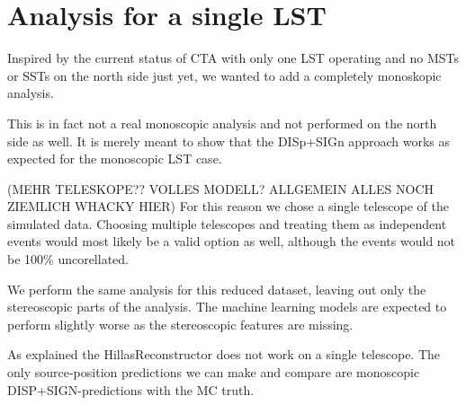 \section{Analysis for a single LST}
Inspired by the current status of CTA with only one LST operating and no MSTs or SSTs
on the north side just yet,
we wanted to add a completely monoskopic analysis.

This is in fact not a real monoscopic analysis and not performed on the north 
side as well. It is merely meant to show that the DISp+SIGn approach works as
expected for the monoscopic LST case.

(MEHR TELESKOPE?? VOLLES MODELL? ALLGEMEIN ALLES NOCH ZIEMLICH WHACKY HIER)
For this reason we chose a single telescope of the simulated data.
Choosing multiple telescopes and treating them as independent events 
would most likely be a valid option as well, although the 
events would not be 100\% uncorellated.

We perform the same analysis for this reduced dataset, leaving out only 
the stereoscopic parts of the analysis.
The machine learning models are expected 
to perform slightly worse as the stereoscopic features are missing.

As explained the HillasReconstructor does not work on a single telescope.
The only source-position predictions we can make and compare are monoscopic 
DISP+SIGN-predictions with the MC truth.